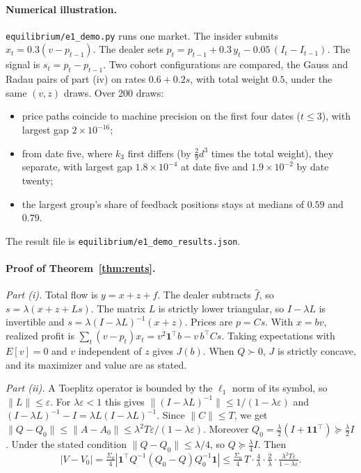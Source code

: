 \documentclass[12pt]{article}
\theoremstyle{definition}
\theoremstyle{remark}
\begin{document}
\paragraph{Numerical illustration.} \nolinkurl{equilibrium/e1_demo.py} runs one market. The insider submits $x_t=0.3(v-p_{t-1})$. The dealer sets $p_t=p_{t-1}+0.3\,y_t-0.05\,(I_t-I_{t-1})$. The signal is $s_t=p_t-p_{t-1}$. Two cohort configurations are compared, the Gauss and Radau pairs of part (iv) on rates $0.6+0.2s$, with total weight $0.5$, under the same $(v,z)$ draws. Over 200 draws:
\begin{itemize}[itemsep=1pt,topsep=2pt]
\item price paths coincide to machine precision on the first four dates ($t\le3$), with largest gap $2\times10^{-16}$;
\item from date five, where $k_3$ first differs (by $\tfrac29d^3$ times the total weight), they separate, with largest gap $1.8\times10^{-4}$ at date five and $1.9\times10^{-2}$ by date twenty;
\item the largest group's share of feedback positions stays at medians of $0.59$ and $0.79$.
\end{itemize}
The result file is \nolinkurl{equilibrium/e1_demo_results.json}.

\paragraph{Proof of Theorem~\ref{thm:rents}.}
\emph{Part (i).} Total flow is $y=x+z+f$. The dealer subtracts $\hat f$, so $s=\lambda(x+z+Ls)$. The matrix $L$ is strictly lower triangular, so $I-\lambda L$ is invertible and $s=\lambda(I-\lambda L)^{-1}(x+z)$. Prices are $p=Cs$. With $x=bv$, realized profit is $\sum_t(v-p_t)x_t=v^2\mathbf1^\top b-v\,b^\top Cs$. Taking expectations with $E[v]=0$ and $v$ independent of $z$ gives $J(b)$. When $Q\succ0$, $J$ is strictly concave, and its maximizer and value are as stated.

\emph{Part (ii).} A Toeplitz operator is bounded by the $\ell_1$ norm of its symbol, so $\|L\|\le\varepsilon$. For $\lambda\varepsilon<1$ this gives $\|(I-\lambda L)^{-1}\|\le1/(1-\lambda\varepsilon)$ and $(I-\lambda L)^{-1}-I=\lambda L(I-\lambda L)^{-1}$. Since $\|C\|\le T$, we get $\|Q-Q_0\|\le\|A-A_0\|\le\lambda^2T\varepsilon/(1-\lambda\varepsilon)$. Moreover $Q_0=\tfrac\lambda2(I+\mathbf1\mathbf1^\top)\succeq\tfrac\lambda2I$. Under the stated condition $\|Q-Q_0\|\le\lambda/4$, so $Q\succeq\tfrac\lambda4I$. Then
\[
|V-V_0|=\tfrac{\Sigma_0}4|\mathbf1^\top Q^{-1}(Q_0-Q)Q_0^{-1}\mathbf1|\le\tfrac{\Sigma_0}4\,T\cdot\tfrac4\lambda\cdot\tfrac2\lambda\cdot\tfrac{\lambda^2T\varepsilon}{1-\lambda\varepsilon}.
\]
\end{document}
